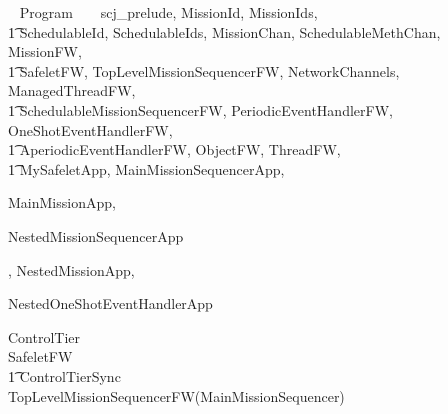
%
\begin{zsection}
  \SECTION ~ Program ~ \parents ~ scj\_prelude, MissionId, MissionIds, \\
  \t1 SchedulableId, SchedulableIds, MissionChan, SchedulableMethChan, MissionFW,\\
  \t1 SafeletFW, TopLevelMissionSequencerFW, NetworkChannels, ManagedThreadFW, \\
  \t1 SchedulableMissionSequencerFW, PeriodicEventHandlerFW, OneShotEventHandlerFW,\\
  \t1 AperiodicEventHandlerFW, ObjectFW, ThreadFW, \\
  \t1 MySafeletApp, MainMissionSequencerApp,

MainMissionApp,

NestedMissionSequencerApp
	
	
	,
NestedMissionApp,

NestedOneShotEventHandlerApp
	
	
	
\end{zsection}
%
\begin{circus}
\circprocess ControlTier \circdef \\
\circblockopen
SafeletFW \\
\t1 \lpar ControlTierSync \rpar \\
TopLevelMissionSequencerFW(MainMissionSequencer)
\circblockclose
\end{circus}
%


